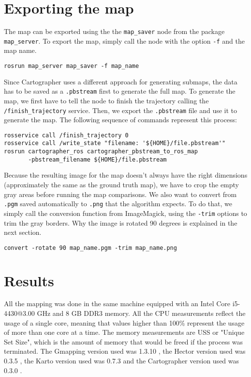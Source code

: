 \section{Exporting the map}

The map can be exported using the the \texttt{map\_saver} node from the package \texttt{map\_server}. To export the map, simply call the node with the option \texttt{-f} and the map name.

\begin{verbatim}
rosrun map_server map_saver -f map_name
\end{verbatim}

Since Cartographer uses a different approach for generating submaps, the data has to be saved as a \texttt{.pbstream} first to generate the full map. To generate the map, we first have to tell the node to finish the trajectory calling the \texttt{/finish\_trajectory} service. Then, we export the \texttt{.pbstream} file and use it to generate the map. The following sequence of commands represent this process:

\begin{verbatim}
rosservice call /finish_trajectory 0
rosservice call /write_state "filename: '${HOME}/file.pbstream'"
rosrun cartographer_ros cartographer_pbstream_to_ros_map 
       -pbstream_filename ${HOME}/file.pbstream
\end{verbatim}

Because the resulting image for the map doesn't always have the right dimensions (approximately the same as the ground truth map), we have to crop the empty gray areas before running the map comparisons. We also want to convert from \texttt{.pgm} saved automatically to \texttt{.png} that the algorithm expects. To do that, we simply call the conversion function from ImageMagick, using the \texttt{-trim} options to trim the gray borders. Why the image is rotated 90 degrees is explained in the next section.

\begin{verbatim}
convert -rotate 90 map_name.pgm -trim map_name.png
\end{verbatim}

\section{Results}

All the mapping was done in the same machine equipped with an Intel Core i5-4430@3.00 GHz and 8 GB DDR3 memory. All the CPU measurements reflect the usage of a single core, meaning that values higher than 100\% represent the usage of more than one core at a time. The memory measurements are USS or "Unique Set Size", which is the amount of memory that would be freed if the process was terminated. The Gmapping version used was 1.3.10 \cite{gmappinggit}, the Hector version used was 0.3.5 \cite{hectorgit}, the Karto version used was 0.7.3 \cite{kartogit} and the Cartographer version used was 0.3.0 \cite{cartographergit}.


